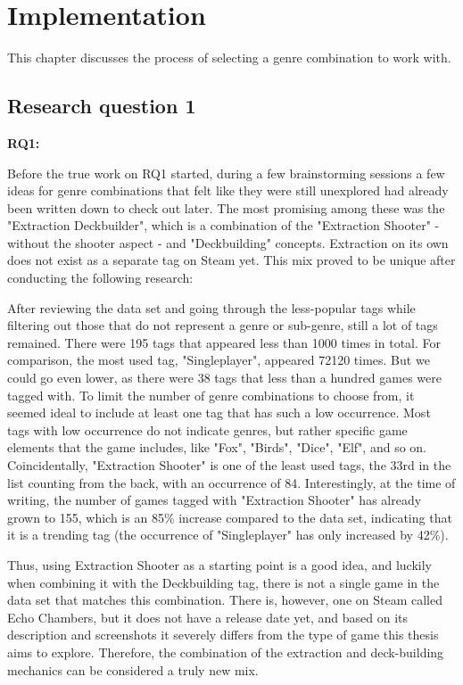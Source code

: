 \chapter{Implementation} \label{Chapter:Implementation}


This chapter discusses the process of selecting a genre combination to work with.


\section{Research question 1} %


\textbf{RQ1:} \textit{\researchQuestionOne}

Before the true work on RQ1 started, during a few brainstorming sessions a few ideas for genre combinations that felt like they were still unexplored had already been written down to check out later. The most promising among these was the "Extraction Deckbuilder", which is a combination of the "Extraction Shooter" - without the shooter aspect - and "Deckbuilding" concepts. Extraction on its own does not exist as a separate tag on Steam yet. This mix proved to be unique after conducting the following research:

After reviewing the data set and going through the less-popular tags while filtering out those that do not represent a genre or sub-genre, still a lot of tags remained. There were 195 tags that appeared less than 1000 times in total. For comparison, the most used tag, "Singleplayer", appeared 72120 times. But we could go even lower, as there were 38 tags that less than a hundred games were tagged with. To limit the number of genre combinations to choose from, it seemed ideal to include at least one tag that has such a low occurrence. Most tags with low occurrence do not indicate genres, but rather specific game elements that the game includes, like "Fox", "Birds", "Dice", "Elf", and so on. Coincidentally, "Extraction Shooter" is one of the least used tags, the 33rd in the list counting from the back, with an occurrence of 84. Interestingly, at the time of writing, the number of games tagged with "Extraction Shooter" has already grown to 155, which is an 85\% increase compared to the data set, indicating that it is a trending tag (the occurrence of "Singleplayer" has only increased by 42\%).

Thus, using Extraction Shooter as a starting point is a good idea, and luckily when combining it with the Deckbuilding tag, there is not a single game in the data set that matches this combination. There is, however, one on Steam called Echo Chambers, but it does not have a release date yet, and based on its description and screenshots it severely differs from the type of game this thesis aims to explore. Therefore, the combination of the extraction and deck-building mechanics can be considered a truly new mix.



